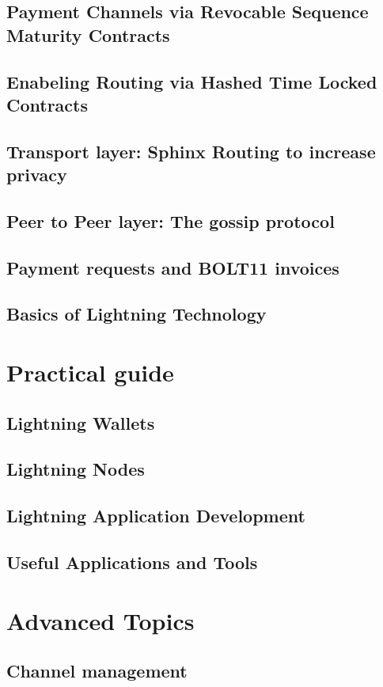 \documentclass[ebook,12pt,oneside,openany]{memoir}
\begin{document}
\section{Payment Channels via Revocable Sequence Maturity Contracts}
\section{Enabeling Routing via Hashed Time Locked Contracts}
\section{Transport layer: Sphinx Routing to increase privacy}
\section{Peer to Peer layer: The gossip protocol}
\section{Payment requests and BOLT11 invoices}
\section{Basics of Lightning Technology}
\chapter{Practical guide}
\section{Lightning Wallets}
\section{Lightning Nodes}
\section{Lightning Application Development}
\section{Useful Applications and Tools}
\chapter{Advanced Topics}
\section{Channel management}
\end{document}

